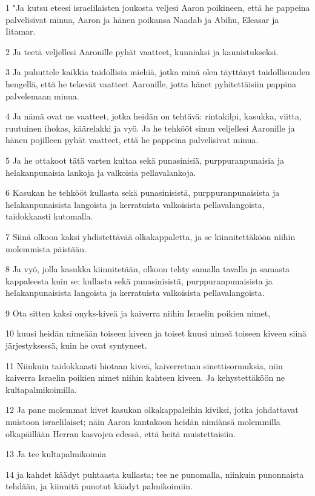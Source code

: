 \par 1 "Ja kutsu eteesi israelilaisten joukosta veljesi Aaron poikineen, että he pappeina palvelisivat minua, Aaron ja hänen poikansa Naadab ja Abihu, Eleasar ja Iitamar.
\par 2 Ja teetä veljellesi Aaronille pyhät vaatteet, kunniaksi ja kaunistukseksi.
\par 3 Ja puhuttele kaikkia taidollisia miehiä, jotka minä olen täyttänyt taidollisuuden hengellä, että he tekevät vaatteet Aaronille, jotta hänet pyhitettäisiin pappina palvelemaan minua.
\par 4 Ja nämä ovat ne vaatteet, jotka heidän on tehtävä: rintakilpi, kasukka, viitta, ruutuinen ihokas, käärelakki ja vyö. Ja he tehkööt sinun veljellesi Aaronille ja hänen pojilleen pyhät vaatteet, että he pappeina palvelisivat minua.
\par 5 Ja he ottakoot tätä varten kultaa sekä punasinisiä, purppuranpunaisia ja helakanpunaisia lankoja ja valkoisia pellavalankoja.
\par 6 Kasukan he tehkööt kullasta sekä punasinisistä, purppuranpunaisista ja helakanpunaisista langoista ja kerratuista valkoisista pellavalangoista, taidokkaasti kutomalla.
\par 7 Siinä olkoon kaksi yhdistettävää olkakappaletta, ja se kiinnitettäköön niihin molemmista päistään.
\par 8 Ja vyö, jolla kasukka kiinnitetään, olkoon tehty samalla tavalla ja samasta kappaleesta kuin se: kullasta sekä punasinisistä, purppuranpunaisista ja helakanpunaisista langoista ja kerratuista valkoisista pellavalangoista.
\par 9 Ota sitten kaksi onyks-kiveä ja kaiverra niihin Israelin poikien nimet,
\par 10 kuusi heidän nimeään toiseen kiveen ja toiset kuusi nimeä toiseen kiveen siinä järjestyksessä, kuin he ovat syntyneet.
\par 11 Niinkuin taidokkaasti hiotaan kiveä, kaiverretaan sinettisormuksia, niin kaiverra Israelin poikien nimet niihin kahteen kiveen. Ja kehystettäköön ne kultapalmikoimilla.
\par 12 Ja pane molemmat kivet kasukan olkakappaleihin kiviksi, jotka johdattavat muistoon israelilaiset; näin Aaron kantakoon heidän nimiänsä molemmilla olkapäillään Herran kasvojen edessä, että heitä muistettaisiin.
\par 13 Ja tee kultapalmikoimia
\par 14 ja kahdet käädyt puhtaasta kullasta; tee ne punomalla, niinkuin punonnaista tehdään, ja kiinnitä punotut käädyt palmikoimiin.
